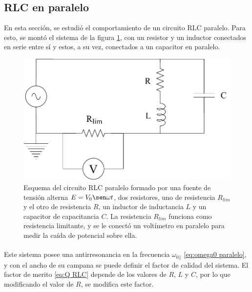 \subsection{RLC en paralelo} \label{sec:RLC paralelo}
En esta sección, se estudió el comportamiento de un circuito RLC paralelo. Para esto, se montó el sistema de la figura \ref{fig:RLC-PARALELO}, con un resistor y un inductor conectados en serie entre sí y estos, a su vez, conectados a un capacitor en paralelo.
\begin{figure} [H]
    \centering
    \includegraphics[width = 0.6\linewidth]{Esquemas/RLC-PARALELO.drawio.pdf}
    \caption{Esquema del circuito RLC paralelo formado por una fuente de tensión alterna $E=V_0\sen \omega t$, dos resistores, uno de resistencia $R_{lim}$ y el otro de resistencia $R$, un inductor de inductancia $L$ y un capacitor de capacitancia $C$. La resistencia $R_{lim}$ funciona como resistencia limitante, y se le conectó un voltímetro en paralelo para medir la caída de potencial sobre ella.}
    \label{fig:RLC-PARALELO}
\end{figure}
\paragraph{}
Este sistema posee una antirresonancia en la frecuencia $\omega_{0||}$ \eqref{eq:omega0 paralelo}, y con el ancho de su campana se puede definir el factor de calidad del sistema. El factor de merito \eqref{eq:Q RLC} depende de los valores de $R$, $L$ y $C$, por lo que modificando el valor de $R$, se modifica este factor.
